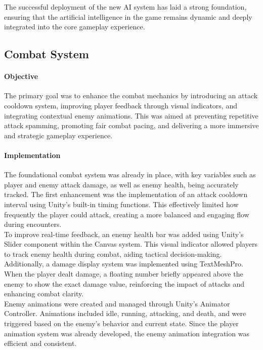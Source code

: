 \documentclass{article}
\begin{document}
The successful deployment of the new AI system has laid a strong foundation, ensuring that the artificial intelligence in the game remains dynamic and deeply integrated into the core gameplay experience.










\newpage
\subsection{Combat System}
\paragraph{Objective}\hfill

The primary goal was to enhance the combat mechanics by introducing an attack cooldown system, improving player feedback through visual indicators, and integrating contextual enemy animations. This was aimed at preventing repetitive attack spamming, promoting fair combat pacing, and delivering a more immersive and strategic gameplay experience.

\paragraph{Implementation}\hfill

The foundational combat system was already in place, with key variables such as player and enemy attack damage, as well as enemy health, being accurately tracked. The first enhancement was the implementation of an attack cooldown interval using Unity's built-in timing functions. This effectively limited how frequently the player could attack, creating a more balanced and engaging flow during encounters.\\

To improve real-time feedback, an enemy health bar was added using Unity's Slider component within the Canvas system. This visual indicator allowed players to track enemy health during combat, aiding tactical decision-making.\\

Additionally, a damage display system was implemented using TextMeshPro. When the player dealt damage, a floating number briefly appeared above the enemy to show the exact damage value, reinforcing the impact of attacks and enhancing combat clarity.\\

Enemy animations were created and managed through Unity's Animator Controller. Animations included idle, running, attacking, and death, and were triggered based on the enemy's behavior and current state. Since the player animation system was already developed, the enemy animation integration was efficient and consistent.\\
\end{document}
